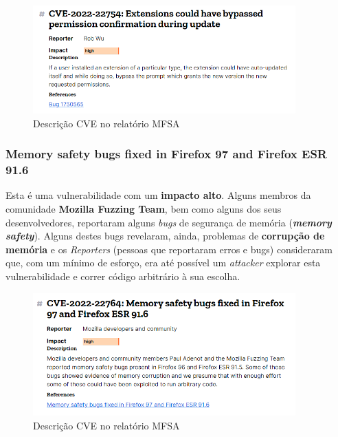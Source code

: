 \documentclass[11t]{article}
\begin{document}
\begin{figure}[H]
    \centering
    \includegraphics[width=0.9\textwidth]{images/descricaoPergunta4-1.png}
    \caption{Descrição CVE no relatório MFSA}
\end{figure}

\clearpage

\subsubsection*{\textbf{Memory safety bugs fixed in Firefox 97 and Firefox ESR 91.6}}

Esta é uma vulnerabilidade com um \textbf{impacto alto}. Alguns membros da comunidade \textbf{Mozilla Fuzzing Team}, bem como alguns dos seus desenvolvedores, reportaram alguns \textit{bugs} de segurança de memória (\textit{\textbf{memory safety}}). Alguns destes bugs revelaram, ainda, problemas de \textbf{corrupção de memória} e os \textit{Reporters} (pessoas que reportaram erros e bugs) consideraram que, com um mínimo de esforço, era até possível um \textit{attacker} explorar esta vulnerabilidade e correr código arbitrário à sua escolha.

\begin{figure}[H]
    \centering
    \includegraphics[width=0.9\textwidth]{images/descricaoPergunta4-2.png}
    \caption{Descrição CVE no relatório MFSA}
\end{figure}

\vspace{0.5cm}
\end{document}

